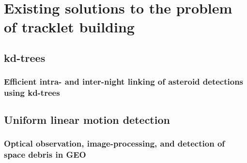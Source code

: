 \chapter{Existing solutions to the problem of tracklet building}\label{chap:existing_solutions}

\section{kd-trees}\label{sec:kd_trees}
\subsection{Efficient intra- and inter-night linking of asteroid detections using kd-trees}\label{subsec:intra_inter}

\section{Uniform linear motion detection}\label{sec:linear_motion}
\subsection{Optical observation, image-processing, and detection of space debris in GEO}\label{subsec:linear_geo}